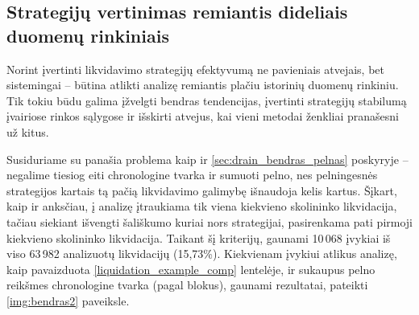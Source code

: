 \documentclass[]{VUMIFTemplateClass}
\begin{document}
\subsection{Strategijų vertinimas remiantis dideliais duomenų rinkiniais}
\label{sec:lyginimas_daug}

Norint įvertinti likvidavimo strategijų efektyvumą ne pavieniais atvejais, bet sistemingai – būtina atlikti analizę remiantis plačiu istorinių duomenų rinkiniu. Tik tokiu būdu galima įžvelgti bendras tendencijas, įvertinti strategijų stabilumą įvairiose rinkos sąlygose ir išskirti atvejus, kai vieni metodai ženkliai pranašesni už kitus.

Susiduriame su panašia problema kaip ir \ref{sec:drain_bendras_pelnas} poskyryje – negalime tiesiog eiti chronologine tvarka ir sumuoti pelno, nes pelningesnės strategijos kartais tą pačią likvidavimo galimybę išnaudoja kelis kartus. Šįkart, kaip ir anksčiau, į analizę įtraukiama tik viena kiekvieno skolininko likvidacija, tačiau siekiant išvengti šališkumo kuriai nors strategijai, pasirenkama pati pirmoji kiekvieno skolininko likvidacija. Taikant šį kriterijų, gaunami 10\,068 įvykiai iš viso 63\,982 analizuotų likvidacijų (15,73\%). Kiekvienam įvykiui atlikus analizę, kaip pavaizduota \ref{liquidation_example_comp} lentelėje, ir sukaupus pelno reikšmes chronologine tvarka (pagal blokus), gaunami rezultatai, pateikti \ref{img:bendras2} paveiksle.
\end{document}
